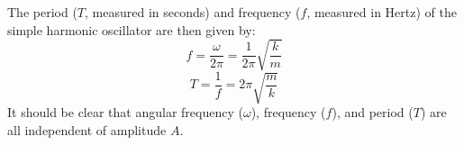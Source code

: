 The period ($T$, measured in seconds) and frequency ($f$, measured in Hertz) of
the simple harmonic oscillator are then given by:
\begin{equation}
  \boxed{
    f=\frac\omega{2\pi}=\frac1{2\pi}\sqrt{\frac km}
  }
\end{equation}
\begin{equation}
  \boxed{
    T=\frac1f=2\pi\sqrt{\frac mk}
  }
\end{equation}
It should be clear that angular frequency ($\omega$), frequency ($f$), and
period ($T$) are all independent of amplitude $A$.


%
%      
%      

